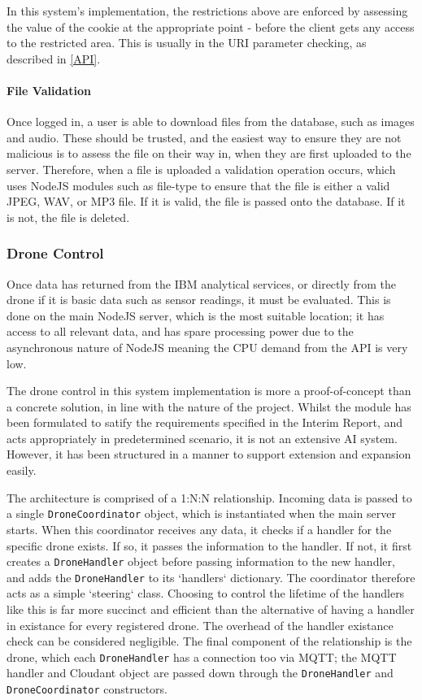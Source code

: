 \documentclass{article}
\begin{document}
In this system's implementation, the restrictions above are enforced by assessing the value of the cookie at the appropriate point - before the client gets any access to the restricted area. This is usually in the URI parameter checking, as described in \ref{API}. 

\paragraph{File Validation}
Once logged in, a user is able to download files from the database, such as images and audio. These should be trusted, and the easiest way to ensure they are not malicious is to assess the file on their way in, when they are first uploaded to the server. Therefore, when a file is uploaded a validation operation occurs, which uses NodeJS modules such as file-type \cite{file-type} to ensure that the file is either a valid JPEG, WAV, or MP3 file. If it is valid, the file is passed onto the database. If it is not, the file is deleted. 


\subsubsection{Drone Control} \label{DroneControl}
Once data has returned from the IBM analytical services, or directly from the drone if it is basic data such as sensor readings, it must be evaluated. This is done on the main NodeJS server, which is the most suitable location; it has access to all relevant data, and has spare processing power due to the asynchronous nature of NodeJS meaning the CPU demand from the API is very low. 

The drone control in this system implementation is more a proof-of-concept than a concrete solution, in line with the nature of the project. Whilst the module has been formulated to satify the requirements specified in the Interim Report, and acts appropriately in predetermined scenario, it is not an extensive AI system. However, it has been structured in a manner to support extension and expansion easily. 

The architecture is comprised of a 1:N:N relationship. Incoming data is passed to a single \texttt{DroneCoordinator} object, which is instantiated when the main server starts. When this coordinator receives any data, it checks if a handler for the specific drone exists. If so, it passes the information to the handler. If not, it first creates a \texttt{DroneHandler} object before passing information to the new handler, and adds the \texttt{DroneHandler} to its `handlers` dictionary. The coordinator therefore acts as a simple `steering` class. Choosing to control the lifetime of the handlers like this is far more succinct and efficient than the alternative of having a handler in existance for every registered drone. The overhead of the handler existance check can be considered negligible. The final component of the relationship is the drone, which each \texttt{DroneHandler} has a connection too via MQTT; the MQTT handler and Cloudant object are passed down through the \texttt{DroneHandler} and \texttt{DroneCoordinator} constructors. 
\end{document}
